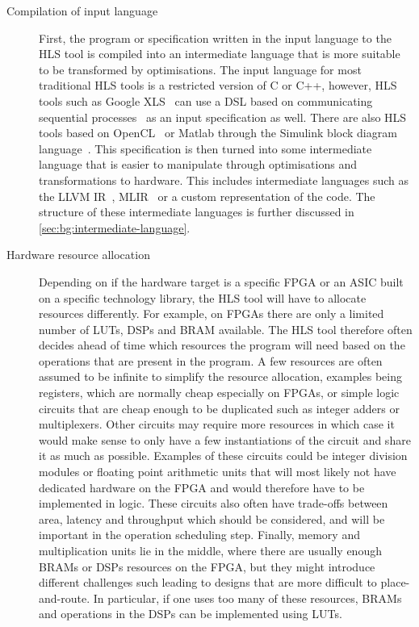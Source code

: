 \begin{description}
\item[Compilation of input language] First, the program or specification written
  in the input language to the \gls{HLS} tool is compiled into an intermediate
  language that is more suitable to be transformed by optimisations.  The input
  language for most traditional \gls{HLS} tools is a restricted version of C or
  C++, however, \gls{HLS} tools such as Google XLS~\cite{google23_xls} can use a
  \gls{DSL} based on communicating sequential
  processes~\cite{hoare78_commun_sequen_proces} as an input specification as
  well.  There are also \gls{HLS} tools based on
  OpenCL~\cite{intel20_sdk_openc_applic} or Matlab through the Simulink block
  diagram language~\cite{ou05_msf}.  This specification is then turned into some
  intermediate language that is easier to manipulate through optimisations and
  transformations to hardware.  This includes intermediate languages such as the
  LLVM \gls{IR}~\cite{lattner04_llvm}, MLIR~\cite{lattner21_mlir} or a custom
  representation of the code.  The structure of these intermediate languages is
  further discussed in \cref{sec:bg:intermediate-language}.

\item[Hardware resource allocation] Depending on if the hardware target is a
  specific \gls{FPGA} or an \gls{ASIC} built on a specific technology library,
  the \gls{HLS} tool will have to allocate resources differently.  For example,
  on \glspl{FPGA} there are only a limited number of \glspl{LUT}, \glspl{DSP}
  and \gls{BRAM} available.  The \gls{HLS} tool therefore often decides ahead of
  time which resources the program will need based on the operations that are
  present in the program.  A few resources are often assumed to be infinite to
  simplify the resource allocation, examples being registers, which are normally
  cheap especially on \glspl{FPGA}, or simple logic circuits that are cheap
  enough to be duplicated such as integer adders or multiplexers.  Other
  circuits may require more resources in which case it would make sense to only
  have a few instantiations of the circuit and share it as much as possible.
  Examples of these circuits could be integer division modules or floating point
  arithmetic units that will most likely not have dedicated hardware on the
  \gls{FPGA} and would therefore have to be implemented in logic.  These
  circuits also often have trade-offs between area, latency and throughput which
  should be considered, and will be important in the operation scheduling step.
  Finally, memory and multiplication units lie in the middle, where there are
  usually enough \glspl{BRAM} or \glspl{DSP} resources on the \gls{FPGA}, but
  they might introduce different challenges such leading to designs that are
  more difficult to place-and-route.  In particular, if one uses too many of
  these resources, \glspl{BRAM} and operations in the \glspl{DSP} can be
  implemented using \glspl{LUT}.


\end{description}
